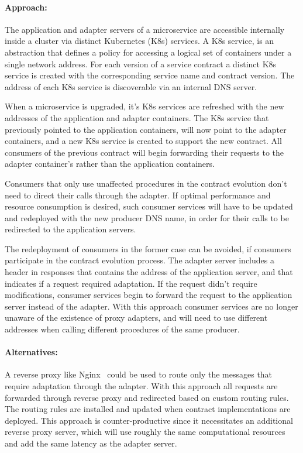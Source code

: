 \paragraph{Approach:} The application and adapter servers of a microservice are accessible internally inside a cluster via distinct Kubernetes (K8s) services.
A K8s service, is an abstraction that defines a policy for accessing a logical set of containers under a single network address.
For each version of a service contract a distinct K8s service is created with the corresponding service name and contract version.
The address of each K8s service is discoverable via an internal DNS server.

When a microservice is upgraded, it's K8s services are refreshed with the new addresses of the application and adapter containers.
The K8s service that previously pointed to the application containers, will now point to the adapter containers, and
a new K8s service is created to support the new contract.
All consumers of the previous contract will begin forwarding their requests to the adapter container's rather than the application containers.

Consumers that only use unaffected procedures in the contract evolution don't need to direct their calls through the adapter.
If optimal performance and resource consumption is desired,
such consumer services will have to be updated and redeployed with the new producer DNS name, in order for their calls to be redirected to the application servers.

The redeployment of consumers in the former case can be avoided, if consumers participate in the contract evolution process.
The adapter server includes a header in responses that contains the address of the application server, and that indicates if a request required adaptation.
If the request didn't require modifications, consumer services begin to forward the request to the application server instead of the adapter.
With this approach consumer services are no longer unaware of the existence of proxy adapters,
and will need to use different addresses when calling different procedures of the same producer.

\paragraph{Alternatives:}
A reverse proxy like Nginx~\cite{nginx} could be used to route only the messages that require adaptation through the adapter.
With this approach all requests are forwarded through reverse proxy and redirected based on custom routing rules.
The routing rules are installed and updated when contract implementations are deployed.
This approach is counter-productive since it necessitates an additional reverse proxy server,
which will use roughly the same computational resources and add the same latency as the adapter server.

